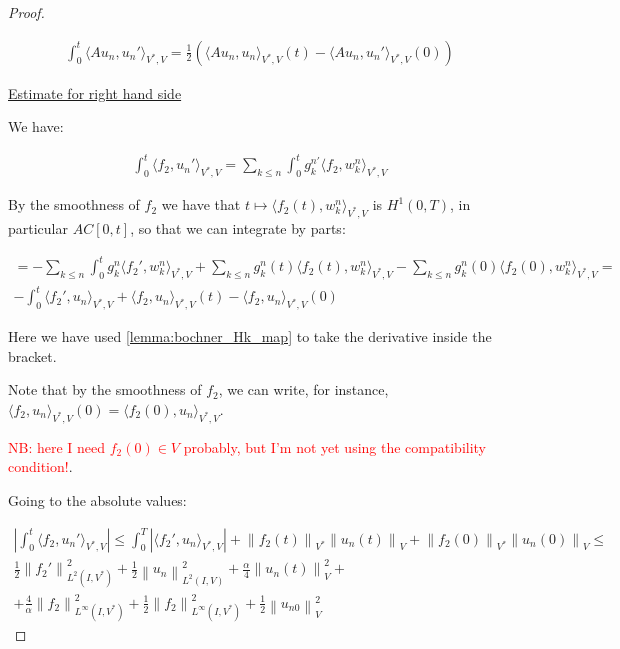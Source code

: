 \documentclass[english,a4paper,9pt,oneside]{scrbook}	%
\theoremstyle{break}
\newenvironment{mproof}[1][\proofname]{%
  \begin{proof}[#1]$ $\par\nobreak\ignorespaces
}{%
  \end{proof}
}
\renewcommand*{\proofname}{Proof}
\theoremstyle{remark}
\newcommand{\norm}[1]{\left\lVert#1\right\rVert}
\newcommand{\VN}[1]{\norm{#1}_{V}}
\newcommand{\VSN}[1]{\norm{#1}_{V^*}}
\newcommand{\tred}[1]{\textcolor{red}{#1}}
\begin{document}
\begin{appendices}
\begin{mproof}
\begin{align*}
	\int_0^t \langle Au_n,u_n' \rangle_{V^*,V} = \frac{1}{2}\left( \langle Au_n,u_n \rangle_{V^*,V}(t)-\langle Au_n,u_n' \rangle_{V^*,V}(0) \right )
\end{align*}

\underline{Estimate for right hand side}

We have:

\begin{align*}
	\int_0^t \langle f_2,u_n' \rangle_{V^*,V} = \sum_{k\leq n}\int_0^tg_k^{n'}\langle f_2,w_k^n \rangle_{V^*,V}
\end{align*}

By the smoothness of $f_2$ we have that $t \mapsto \langle f_2(t),w_k^n \rangle_{V^*,V}$ is $H^1(0,T)$, in particular $AC[0,t]$, so that we can integrate by parts:

\begin{align*}
	 = - \sum_{k\leq n}\int_0^tg_k^{n}\langle f_2',w_k^n \rangle_{V^*,V} + \sum_{k\leq n} g_k^{n}(t)\langle f_2(t),w_k^n \rangle_{V^*,V} - \sum_{k\leq n} g_k^{n}(0)\langle f_2(0),w_k^n \rangle_{V^*,V} = \\
	 -\int_0^t \langle f_2',u_n \rangle_{V^*,V} + \langle f_2,u_n \rangle_{V^*,V}(t)-\langle f_2,u_n \rangle_{V^*,V}(0)
\end{align*}

Here we have used \cref{lemma:bochner_Hk_map} to take the derivative inside the bracket.

Note that by the smoothness of $f_2$, we can write, for instance, $\langle f_2,u_n \rangle_{V^*,V}(0) = \langle f_2(0),u_n \rangle_{V^*,V}$.

\tred{NB: here I need $f_2(0) \in V$ probably, but I'm not yet using the compatibility condition!}.

Going to the absolute values:

\begin{align*}
	\left | \int_0^t \langle f_2,u_n' \rangle_{V^*,V}\right | \leq 
	\int_0^T |\langle f_2',u_n \rangle_{V^*,V}|+ \VSN{f_2(t)}\VN{u_n(t)}+\VSN{f_2(0)}\VN{u_n(0)} \leq \\
	\frac{1}{2}\norm{f_2'}_{L^2(I,V^*)}^2 + \frac{1}{2}\norm{u_n}_{L^2(I,V)}^2 + \frac{\alpha}{4}\VN{u_n(t)}^2 +\\
	+ \frac{4}{\alpha}\norm{f_2}_{L^\infty(I,V^*)}^2+ \frac{1}{2}\norm{f_2}_{L^\infty(I,V^*)}^2+\frac{1}{2}\VN{u_{n0}}^2
\end{align*}


\end{mproof}
\end{appendices}
\end{document}
